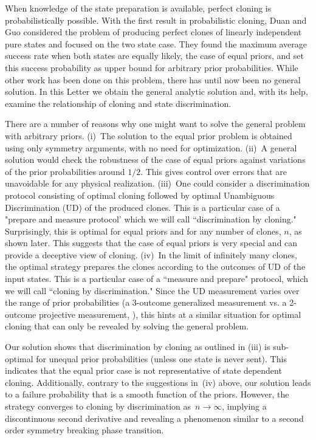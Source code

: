 \documentclass[aps,prl,twocolumn,showpacs]{revtex4}
\begin{document}
When knowledge of the state preparation is available, perfect cloning is probabilistically possible. With the first result in probabilistic cloning, Duan and Guo \cite{DuanGuo} considered the problem of producing perfect clones of linearly independent pure states and focused on the two state case.  They found the maximum average success rate when both states are equally likely, the case of equal priors, and set this success probability as upper bound for arbitrary prior probabilities.  While other work has been done on this problem, there has until now been no general solution. In this Letter we obtain the general analytic solution and, with its help, examine the relationship of cloning and state discrimination.
 
There are a number of reasons why one might want to solve the general problem with arbitrary priors.  (i)~The solution to the equal prior problem is obtained using only symmetry arguments, with no need for optimization. (ii)~A general solution would check the robustness of the case of equal priors against variations of the prior probabilities around $1/2$.  This gives control over errors that are unavoidable for any physical realization. (iii)~One could consider a discrimination protocol consisting of optimal cloning followed by optimal Unambiguous Discrimination (UD) of the produced clones. This is a particular case of a "prepare and measure protocol' which we will call ``discrimination by cloning." Surprisingly, this is optimal for equal priors and for any number of clones, $n$, as shown later.  This suggests that the case of equal priors is very special and can provide a deceptive view of cloning.  (iv)~In the limit of infinitely many clones, the optimal strategy prepares the clones according to the outcomes of UD of the input states. This is a particular case of a ``measure and prepare" protocol, which we will call ``cloning by discrimination." Since the UD measurement varies over the range of prior probabilities (a 3-outcome generalized measurement vs. a 2-outcome projective measurement, \cite{Bergou}), this hints at a similar situation for optimal cloning that can only be revealed by solving the general problem. 

Our solution shows that discrimination by cloning as outlined in (iii) is sub-optimal for unequal prior probabilities (unless one state is never sent). This indicates that the equal prior case is not representative of state dependent cloning.  Additionally, contrary to the suggestions in~(iv) above, our solution leads to a failure probability that is a smooth function of the priors. However,  the strategy converges to cloning by discrimination as~$n\to\infty$, implying a discontinuous second derivative and revealing a phenomenon similar to a second order symmetry breaking phase transition.
\end{document}

